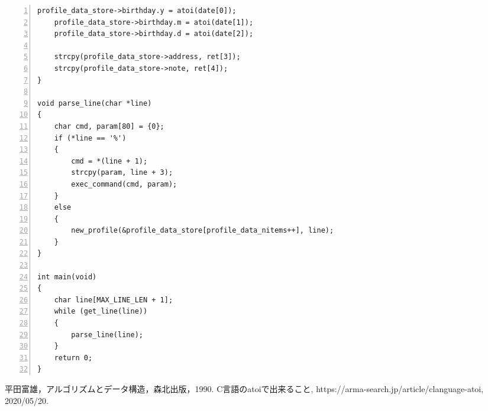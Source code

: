 \documentclass[autodetect-engine,dvi=dvipdfmx,ja=standard,
               a4j,11pt]{bxjsarticle}
\begin{document}
\begin{Verbatim}[numbers=left, xleftmargin=10mm, numbersep=6pt,
    fontsize=\small, baselinestretch=0.8]
    profile_data_store->birthday.y = atoi(date[0]);
    profile_data_store->birthday.m = atoi(date[1]);
    profile_data_store->birthday.d = atoi(date[2]);

    strcpy(profile_data_store->address, ret[3]);
    strcpy(profile_data_store->note, ret[4]);
}

void parse_line(char *line)
{
    char cmd, param[80] = {0};
    if (*line == '%')
    {
        cmd = *(line + 1);
        strcpy(param, line + 3);
        exec_command(cmd, param);
    }
    else
    {
        new_profile(&profile_data_store[profile_data_nitems++], line);
    }
}

int main(void)
{
    char line[MAX_LINE_LEN + 1];
    while (get_line(line))
    {
        parse_line(line);
    }
    return 0;
}

\end{Verbatim}


\begin{thebibliography}{99}
   平田富雄，アルゴリズムとデータ構造，森北出版，1990.
   C言語のatoiで出来ること, https://arma-search.jp/article/clanguage-atoi, 2020/05/20.
\end{thebibliography}

\end{document}
